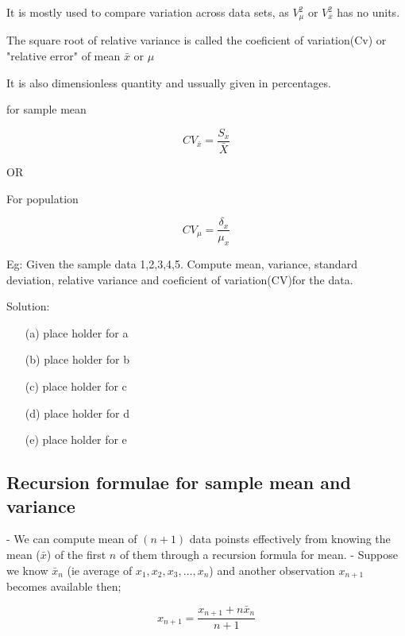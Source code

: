 \documentclass[12pt]{article}
\begin{document}
It is mostly used to compare variation across data sets, as $V_{\mu}^2$ or $V_{\bar{x}}^2$ has no units.

The square root of relative variance is called the coeficient of variation(Cv) or "relative error" of mean $\bar{x}$ or $\mu$

It is also dimensionless quantity and ussually given in percentages.

\begin{center}
    for sample mean
\end{center}
\begin{equation}
    CV_{\bar{x}} = \frac{S_x}{\bar{X}}
\end{equation}
\begin{center}
    OR
\end{center}
\begin{center}
    For population
\end{center}
\begin{equation}
    CV_{\mu} = \frac{\delta_x}{\mu_x}
\end{equation}


Eg: Given the sample data 1,2,3,4,5. Compute mean, variance, standard deviation, relative variance and coeficient of variation(CV)for the data.

Solution:

\begin{enumerate}
    \item[(a)] place holder for a
    \item[(b)] place holder for b
    \item[(c)] place holder for c
    \item[(d)] place holder for d
    \item[(e)] place holder for e
\end{enumerate}
\subsection{Recursion formulae for sample mean and variance}
- We can compute mean of $(n + 1)$ data poinsts effectively from knowing the mean ($\bar{x}$) of the first $n$ of them through a recursion formula for mean.
- Suppose we know $\bar{x}_{n}$ (ie average of $x_1, x_2, x_3, \dots, x_n$) and another observation $x_{n+1}$ becomes available then;

\begin{equation}
    x_{n + 1} = \frac{x_{n+1} + n\bar{x}_n}{n + 1}
\end{equation}
\end{document}
